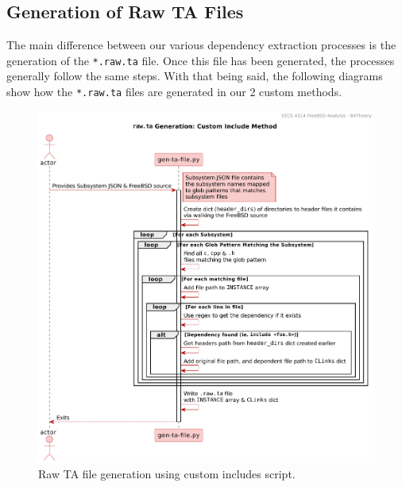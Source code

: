 \documentclass[12pt, dvipsnames, a4paper]{article}
\begin{document}
\clearpage
\subsection{Generation of Raw TA Files}
The main difference between our various dependency extraction processes
is the generation of the \texttt{*.raw.ta} file. Once this file has been generated,
the processes generally follow the same steps. With that being said,
the following diagrams show how the \texttt{*.raw.ta} files are generated
in our 2 custom methods.
\begin{figure}[!htb]
	\center
	\includegraphics[width = 350pt]{assets/sequence_diagrams/custom_includes.pdf}
	\caption{Raw TA file generation using custom includes script.\cite{sourcecode}}
\end{figure}
\end{document}
